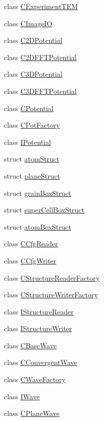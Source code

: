\begin{DoxyCompactItemize}
\item 
class \hyperlink{class_q_s_t_e_m_1_1_c_experiment_t_e_m}{C\-Experiment\-T\-E\-M}
\item 
class \hyperlink{class_q_s_t_e_m_1_1_c_image_i_o}{C\-Image\-I\-O}
\item 
class \hyperlink{class_q_s_t_e_m_1_1_c2_d_potential}{C2\-D\-Potential}
\item 
class \hyperlink{class_q_s_t_e_m_1_1_c2_d_f_f_t_potential}{C2\-D\-F\-F\-T\-Potential}
\item 
class \hyperlink{class_q_s_t_e_m_1_1_c3_d_potential}{C3\-D\-Potential}
\item 
class \hyperlink{class_q_s_t_e_m_1_1_c3_d_f_f_t_potential}{C3\-D\-F\-F\-T\-Potential}
\item 
class \hyperlink{class_q_s_t_e_m_1_1_c_potential}{C\-Potential}
\item 
class \hyperlink{class_q_s_t_e_m_1_1_c_pot_factory}{C\-Pot\-Factory}
\item 
class \hyperlink{class_q_s_t_e_m_1_1_i_potential}{I\-Potential}
\item 
struct \hyperlink{struct_q_s_t_e_m_1_1atom_struct}{atom\-Struct}
\item 
struct \hyperlink{struct_q_s_t_e_m_1_1plane_struct}{plane\-Struct}
\item 
struct \hyperlink{struct_q_s_t_e_m_1_1grain_box_struct}{grain\-Box\-Struct}
\item 
struct \hyperlink{struct_q_s_t_e_m_1_1super_cell_box_struct}{super\-Cell\-Box\-Struct}
\item 
struct \hyperlink{struct_q_s_t_e_m_1_1atom_box_struct}{atom\-Box\-Struct}
\item 
class \hyperlink{class_q_s_t_e_m_1_1_c_cfg_reader}{C\-Cfg\-Reader}
\item 
class \hyperlink{class_q_s_t_e_m_1_1_c_cfg_writer}{C\-Cfg\-Writer}
\item 
class \hyperlink{class_q_s_t_e_m_1_1_c_structure_reader_factory}{C\-Structure\-Reader\-Factory}
\item 
class \hyperlink{class_q_s_t_e_m_1_1_c_structure_writer_factory}{C\-Structure\-Writer\-Factory}
\item 
class \hyperlink{class_q_s_t_e_m_1_1_i_structure_reader}{I\-Structure\-Reader}
\item 
class \hyperlink{class_q_s_t_e_m_1_1_i_structure_writer}{I\-Structure\-Writer}
\item 
class \hyperlink{class_q_s_t_e_m_1_1_c_base_wave}{C\-Base\-Wave}
\item 
class \hyperlink{class_q_s_t_e_m_1_1_c_convergent_wave}{C\-Convergent\-Wave}
\item 
class \hyperlink{class_q_s_t_e_m_1_1_c_wave_factory}{C\-Wave\-Factory}
\item 
class \hyperlink{class_q_s_t_e_m_1_1_i_wave}{I\-Wave}
\item 
class \hyperlink{class_q_s_t_e_m_1_1_c_plane_wave}{C\-Plane\-Wave}
\end{DoxyCompactItemize}
